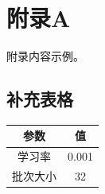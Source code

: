 
\chapter{附录A}

附录内容示例。

\section{补充表格}

\begin{table}[htbp]
    \centering
    \begin{tabular}{cc}
        \toprule
        \textbf{参数} & \textbf{值} \\
        \midrule
        学习率 & 0.001 \\
        批次大小 & 32 \\
        \bottomrule
    \end{tabular}
\end{table}
